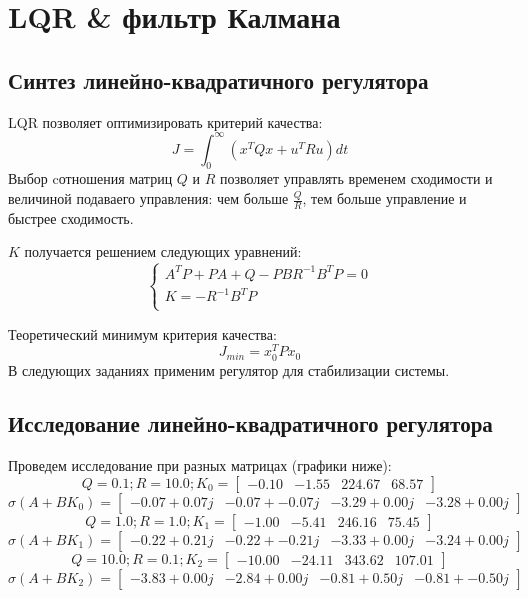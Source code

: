 \section{LQR \& фильтр Калмана}
\subsection{Синтез линейно-квадратичного регулятора}
LQR позволяет оптимизировать критерий качества:
\[J = \int_0^\infty (x^T Q x + u^T R u)dt \]
Выбор cотношения матриц \(Q\) и \(R\) позволяет управлять временем сходимости и величиной подаваего управления: чем больше \(\frac{Q}{R}\), тем больше управление и быстрее сходимость.

\(K\) получается решением следующих уравнений:
    \begin{equation}
        \begin{cases}
            A^T P + P A + Q - PBR^{-1}B^TP = 0\\
            K = -R^{-1} B^T P \\
        \end{cases}
    \end{equation}

Теоретический минимум критерия качества:
\[J_{min} = x_0^T P x_0\]
В следующих заданиях применим регулятор для стабилизации системы.

\subsection{Исследование линейно-квадратичного регулятора}
Проведем исследование при разных матрицах (графики ниже):
\[Q = 0.1; R = 10.0; K_0 = \begin{bmatrix}
    -0.10 & -1.55 &  224.67 &  68.57
   \end{bmatrix}\]
   \[\sigma(A+BK_0) = \begin{bmatrix}
    -0.07 + 0.07j & -0.07 + -0.07j & -3.29 + 0.00j & -3.28 + 0.00j
   \end{bmatrix}\]
   \[Q = 1.0; R = 1.0; K_1 = \begin{bmatrix}
    -1.00 & -5.41 &  246.16 &  75.45
   \end{bmatrix}\]
   \[\sigma(A+BK_1) = \begin{bmatrix}
    -0.22 + 0.21j & -0.22 + -0.21j & -3.33 + 0.00j & -3.24 + 0.00j
   \end{bmatrix}\]
   \[Q = 10.0; R = 0.1; K_2 = \begin{bmatrix}
    -10.00 & -24.11 &  343.62 &  107.01
   \end{bmatrix}\]
   \[\sigma(A+BK_2) = \begin{bmatrix}
    -3.83 + 0.00j & -2.84 + 0.00j & -0.81 + 0.50j & -0.81 + -0.50j
   \end{bmatrix}\]

